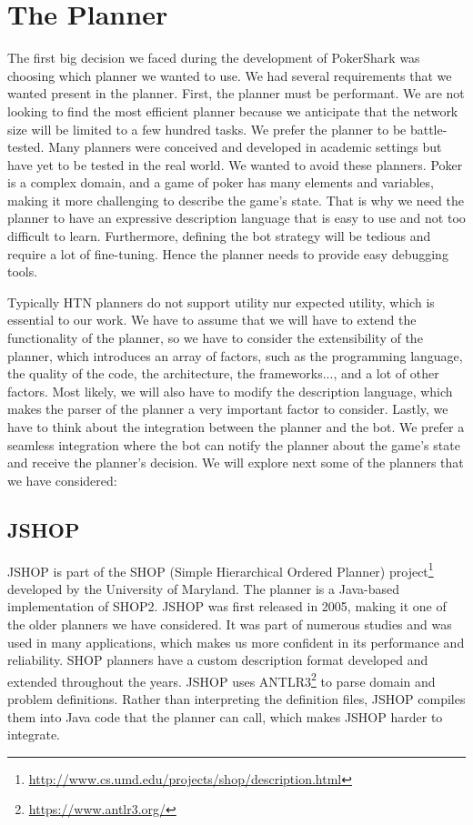 
\section{The Planner}

The first big decision we faced during the development of PokerShark was choosing which planner we wanted to use. We had several requirements that we wanted present in the planner. First, the planner must be performant. We are not looking to find the most efficient planner because we anticipate that the network size will be limited to a few hundred tasks. We prefer the planner to be battle-tested. Many planners were conceived and developed in academic settings but have yet to be tested in the real world. We wanted to avoid these planners. Poker is a complex domain, and a game of poker has many elements and variables, making it more challenging to describe the game's state. That is why we need the planner to have an expressive description language that is easy to use and not too difficult to learn. Furthermore, defining the bot strategy will be tedious and require a lot of fine-tuning. Hence the planner needs to provide easy debugging tools.

Typically HTN planners do not support utility nur expected utility, which is essential to our work. We have to assume that we will have to extend the functionality of the planner, so we have to consider the extensibility of the planner, which introduces an array of factors, such as the programming language, the quality of the code, the architecture, the frameworks..., and a lot of other factors. Most likely, we will also have to modify the description language, which makes the parser of the planner a very important factor to consider. Lastly, we have to think about the integration between the planner and the bot. We prefer a seamless integration where the bot can notify the planner about the game's state and receive the planner's decision. We will explore next some of the planners that we have considered:



\subsection*{JSHOP}

JSHOP is part of the SHOP (Simple Hierarchical Ordered Planner) project\footnote{\url{http://www.cs.umd.edu/projects/shop/description.html}} developed by the University of Maryland. The planner is a Java-based implementation of SHOP2. JSHOP was first released in 2005, making it one of the older planners we have considered. It was part of numerous studies and was used in many applications, which makes us more confident in its performance and reliability. SHOP planners have a custom description format developed and extended throughout the years. JSHOP uses ANTLR3\footnote{\url{https://www.antlr3.org/}} to parse domain and problem definitions. Rather than interpreting the definition files, JSHOP compiles them into Java code that the planner can call, which makes JSHOP harder to integrate.

